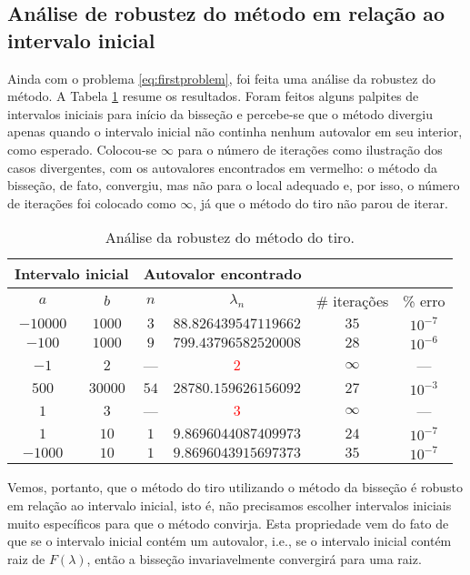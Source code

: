 \documentclass[twocolumn,showpacs,%
  nofootinbib,aps,superscriptaddress,%
  eqsecnum,prd,notitlepage,showkeys,10pt]{revtex4-1}
\begin{document}
\subsection{Análise de robustez do método em relação ao intervalo inicial}\label{subsec:robustez}
%
Ainda com o problema \eqref{eq:firstproblem}, foi feita uma análise da robustez do método.
A Tabela \ref{tab:robustez} resume os resultados. Foram feitos alguns palpites de intervalos
iniciais para início da bisseção e percebe-se que o método divergiu apenas quando o intervalo
inicial não continha nenhum autovalor em seu interior, como esperado. Colocou-se $\infty$
para o número de iterações como ilustração dos casos divergentes, com os autovalores encontrados
em vermelho: o método da bisseção, de fato, convergiu, mas não para o local adequado e, por isso,
o número de iterações foi colocado como $\infty$, já que o método do tiro não parou de iterar.
%
\begin{table}[H]
    \centering
    \caption{Análise da robustez do método do tiro.}
    \begin{tabular}{cc|cc|c|c}
        \multicolumn{2}{c}{Intervalo inicial} & \multicolumn{2}{c}{Autovalor encontrado}
        & \multicolumn{2}{c}{} \\
        \hline
        $a$ & $b$ & $n$ & $\lambda_n$ & \# iterações & \% erro \\
        \hline
        $-10000$ & $1000$ & $3$ & $88.826439547119662$ & $35$ & $10^{-7}$ \\
        $-100$ & $1000$ & $9$ & $799.43796582520008$ & $28$ & $10^{-6}$ \\
        $-1$ & $2$ & --- & \textcolor{red}{$2$} & $\infty$ & --- \\
        $500$ & $30000$ & $54$ & $28780.159626156092$ & $27$ & $10^{-3}$ \\
        $1$ & $3$ & --- & \textcolor{red}{$3$} & $\infty$ & --- \\
        $1$ & $10$ & $1$ & $9.8696044087409973$ & $24$ & $10^{-7}$ \\
        $-1000$ & $10$ & $1$ & $9.8696043915697373$ & $35$ & $10^{-7}$ \\
        \hline
    \end{tabular}
    \label{tab:robustez}
\end{table}
%
Vemos, portanto, que o método do tiro utilizando o método da bisseção é robusto em relação
ao intervalo inicial, isto é, não precisamos escolher intervalos iniciais muito específicos
para que o método convirja.
Esta propriedade vem do fato de que se o intervalo inicial contém um autovalor, i.e., se
o intervalo inicial contém raiz de $F(\lambda)$, então a bisseção invariavelmente convergirá
para uma raiz.
%
\end{document}
